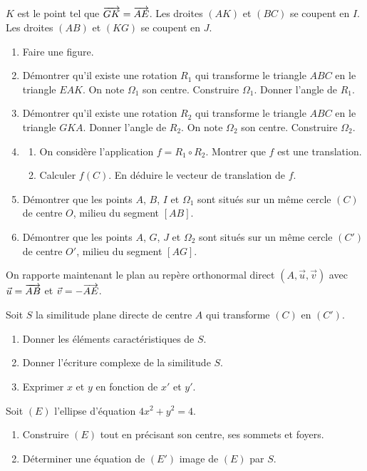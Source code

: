 \documentclass[11pt]{article}
\begin{document}
$K$ est le point tel que $\overrightarrow{GK} = \overrightarrow{AE}$. Les droites $(AK)$ et $(BC)$ se coupent en $I$. Les droites $(AB)$ et $(KG)$ se coupent en $J$.

\begin{enumerate}
  \item Faire une figure.
  \item Démontrer qu'il existe une rotation $R_1$ qui transforme le triangle $ABC$ en le triangle $EAK$. On note $\Omega_1$ son centre. Construire $\Omega_1$. Donner l'angle de $R_1$.
  \item Démontrer qu'il existe une rotation $R_2$ qui transforme le triangle $ABC$ en le triangle $GKA$. Donner l'angle de $R_2$. On note $\Omega_2$ son centre. Construire $\Omega_2$.
  \item \begin{enumerate}[label=\alph*.]
    \item On considère l'application $f = R_1 \circ R_2$. Montrer que $f$ est une translation.
    \item Calculer $f(C)$. En déduire le vecteur de translation de $f$.
  \end{enumerate}
  \item Démontrer que les points $A$, $B$, $I$ et $\Omega_1$ sont situés sur un même cercle $(C)$ de centre $O$, milieu du segment $[AB]$.
  \item Démontrer que les points $A$, $G$, $J$ et $\Omega_2$ sont situés sur un même cercle $(C')$ de centre $O'$, milieu du segment $[AG]$.
\end{enumerate}

On rapporte maintenant le plan au repère orthonormal direct $(A,\vec{u},\vec{v})$ avec $\vec{u} = \overrightarrow{AB}$ et $\vec{v} = -\overrightarrow{AE}$.

Soit $S$ la similitude plane directe de centre $A$ qui transforme $(C)$ en $(C')$.

\begin{enumerate}[start=7]
  \item Donner les éléments caractéristiques de $S$.
  \item Donner l'écriture complexe de la similitude $S$.
  \item Exprimer $x$ et $y$ en fonction de $x'$ et $y'$.
\end{enumerate}

Soit $(E)$ l'ellipse d'équation $4x^2 + y^2 = 4$.

\begin{enumerate}[start=10]
  \item Construire $(E)$ tout en précisant son centre, ses sommets et foyers.
  \item Déterminer une équation de $(E')$ image de $(E)$ par $S$.
\end{enumerate}
\end{document}
